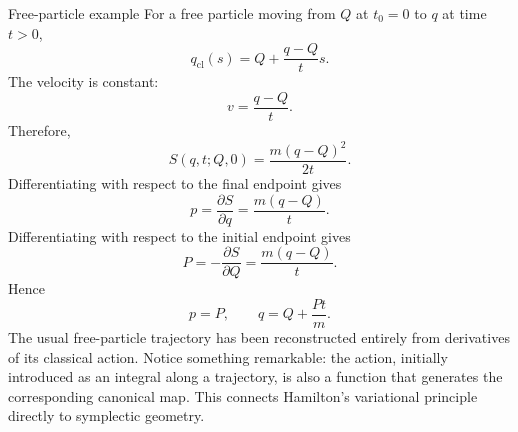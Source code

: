 Free-particle example
For a free particle moving from \(Q\) at \(t_0=0\) to \(q\) at time \(t>0\),
\[
q_{\mathrm{cl}}(s)=Q+\frac{q-Q}{t}s.
\]
The velocity is constant:
\[
v=\frac{q-Q}{t}.
\]
Therefore,
\[
\boxed{
S(q,t;Q,0)=\frac{m(q-Q)^2}{2t}.
}
\]
Differentiating with respect to the final endpoint gives
\[
p=\frac{\partial S}{\partial q}
=\frac{m(q-Q)}{t}.
\]
Differentiating with respect to the initial endpoint gives
\[
P=-\frac{\partial S}{\partial Q}
=\frac{m(q-Q)}{t}.
\]
Hence
\[
p=P,
\qquad
q=Q+\frac{Pt}{m}.
\]
The usual free-particle trajectory has been reconstructed entirely from
derivatives of its classical action. Notice something remarkable: the action,
initially introduced as an integral along a trajectory, is also a function that
generates the corresponding canonical map. This connects Hamilton's variational
principle directly to symplectic geometry.

